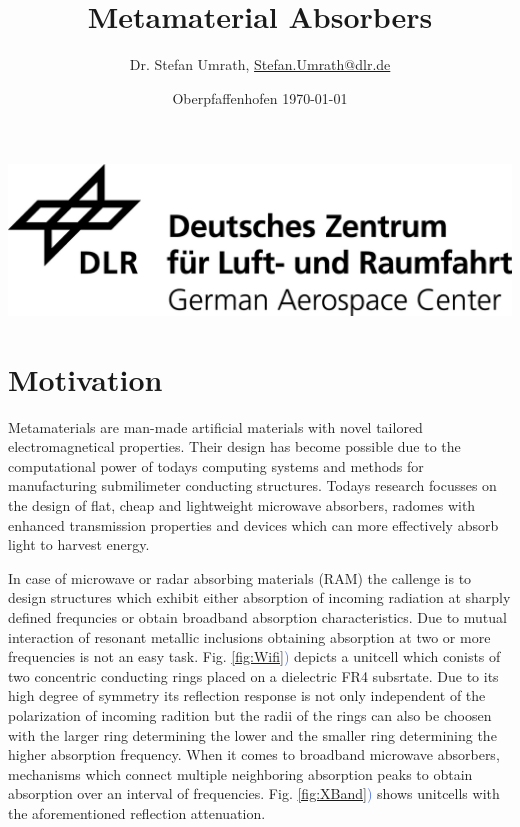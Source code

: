 \documentclass[a4paper,12pt]{scrartcl}  %
\title{Metamaterial Absorbers}
\author[1]{Dr. Stefan Umrath, \href{mailto:Stefan.Umrath@dlr.de}{Stefan.Umrath@dlr.de}}
\affil[1]{German Aerospace Center (DLR)}
\date{Oberpfaffenhofen \today{} \vspace{3cm}}
\newcommand{\capFref}[1]{Fig. \ref{#1}\textcolor{RoyalBlue}{)}}
\begin{document}
\maketitle
\begin{center}
\includegraphics[width= 0.75\linewidth]{../media/DLR_Logo_engl_schwarz.jpg}
\end{center}

\newpage
\tableofcontents 
\newpage
\section{Motivation}

Metamaterials are man-made artificial materials with novel tailored electromagnetical properties.
Their design has become possible due to the computational power of todays computing systems and 
methods for manufacturing submilimeter conducting structures. Todays research focusses on the 
design of flat, cheap and lightweight microwave absorbers, radomes with enhanced transmission
properties and devices which can more effectively absorb light to harvest energy.

In case of microwave or radar absorbing materials (RAM) the callenge is to design structures
which exhibit either absorption of incoming radiation at sharply defined frequncies or obtain broadband
absorption characteristics. 
Due to mutual interaction of resonant metallic inclusions obtaining absorption at two or more 
frequencies is not an easy task. \capFref{fig:Wifi} depicts a unitcell which conists of two concentric conducting rings placed on a dielectric FR4 subsrtate. Due to its high degree of symmetry its reflection
response is not only independent of the polarization of incoming radition but the radii of the rings 
can also be choosen with the larger ring determining the lower and the smaller ring determining the higher absorption frequency.
When it comes to broadband microwave absorbers, mechanisms which connect multiple neighboring 
absorption peaks to obtain absorption over an interval of frequencies. \capFref{fig:XBand} shows 
unitcells with the aforementioned reflection attenuation.
\end{document}
